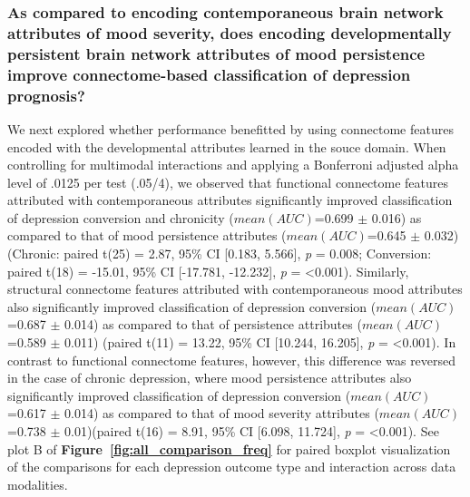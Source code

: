 \documentclass[
  notitlepage]{article}
\begin{document}
\hypertarget{as-compared-to-encoding-contemporaneous-brain-network-attributes-of-mood-severity-does-encoding-developmentally-persistent-brain-network-attributes-of-mood-persistence-improve-connectome-based-classification-of-depression-prognosis}{%
\subsubsection{As compared to encoding contemporaneous brain network
attributes of mood severity, does encoding developmentally persistent
brain network attributes of mood persistence improve connectome-based
classification of depression
prognosis?}\label{as-compared-to-encoding-contemporaneous-brain-network-attributes-of-mood-severity-does-encoding-developmentally-persistent-brain-network-attributes-of-mood-persistence-improve-connectome-based-classification-of-depression-prognosis}}
We next explored whether performance benefitted by using connectome
features encoded with the developmental attributes learned in the souce
domain. When controlling for multimodal interactions and applying a
Bonferroni adjusted alpha level of .0125 per test (.05/4), we observed
that functional connectome features attributed with contemporaneous
attributes significantly improved classification of depression
conversion and chronicity (\(mean(AUC)\)=0.699 \(\pm\) 0.016) as
compared to that of mood persistence attributes (\(mean(AUC)\)=0.645
\(\pm\) 0.032)(Chronic: paired t(25) = 2.87, 95\% CI {[}0.183, 5.566{]},
\emph{p} = 0.008; Conversion: paired t(18) = -15.01, 95\% CI {[}-17.781,
-12.232{]}, \emph{p} = \textless0.001). Similarly, structural connectome
features attributed with contemporaneous mood attributes also
significantly improved classification of depression conversion
(\(mean(AUC)\)=0.687 \(\pm\) 0.014) as compared to that of persistence
attributes (\(mean(AUC)\)=0.589 \(\pm\) 0.011) (paired t(11) = 13.22,
95\% CI {[}10.244, 16.205{]}, \emph{p} = \textless0.001). In contrast to
functional connectome features, however, this difference was reversed in
the case of chronic depression, where mood persistence attributes also
significantly improved classification of depression conversion
(\(mean(AUC)\)=0.617 \(\pm\) 0.014) as compared to that of mood severity
attributes (\(mean(AUC)\)=0.738 \(\pm\) 0.01)(paired t(16) = 8.91, 95\%
CI {[}6.098, 11.724{]}, \emph{p} = \textless0.001). See plot B of \textbf{Figure~\ref{fig:all_comparison_freq}} for paired boxplot visualization of the
comparisons for each depression outcome type and interaction across data
modalities.
\end{document}
